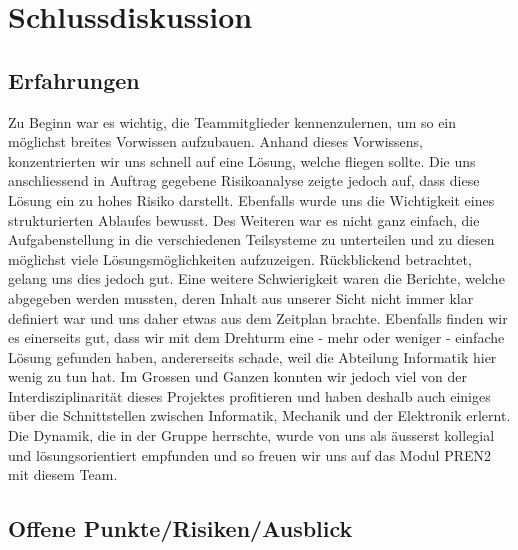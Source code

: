 \section{Schlussdiskussion}

\subsection{Erfahrungen}

Zu Beginn war es wichtig, die Teammitglieder kennenzulernen, um so ein 
möglichst breites Vorwissen aufzubauen. Anhand dieses Vorwissens, 
konzentrierten wir uns schnell auf eine Lösung, welche fliegen sollte. Die uns 
anschliessend in Auftrag gegebene Risikoanalyse zeigte jedoch auf, dass diese 
Lösung ein zu hohes Risiko darstellt. Ebenfalls wurde uns die 
Wichtigkeit eines strukturierten Ablaufes bewusst. Des Weiteren war es nicht ganz  
einfach, die Aufgabenstellung in die verschiedenen Teilsysteme zu unterteilen  
und zu diesen möglichst viele Lösungsmöglichkeiten aufzuzeigen. 
Rückblickend betrachtet, gelang uns dies jedoch gut. Eine weitere 
Schwierigkeit waren die Berichte, welche abgegeben werden mussten, 
deren Inhalt aus unserer Sicht nicht immer klar definiert war und uns daher 
etwas aus dem Zeitplan brachte.
Ebenfalls finden wir es einerseits gut, dass wir mit dem Drehturm eine - mehr oder weniger - einfache Lösung gefunden haben, andererseits schade, weil die Abteilung Informatik hier wenig zu tun hat. Im Grossen und Ganzen konnten wir jedoch viel 
von der Interdisziplinarität dieses Projektes profitieren und haben deshalb 
auch einiges über die Schnittstellen zwischen Informatik, Mechanik und der Elektronik 
erlernt. Die Dynamik, die in der Gruppe herrschte, wurde von uns als äusserst kollegial und lösungsorientiert empfunden und so freuen wir uns auf das Modul PREN2 mit diesem Team.


\subsection{Offene Punkte/Risiken/Ausblick}

